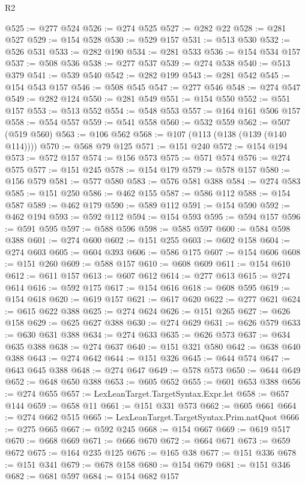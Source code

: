 \begin{lexlean}{R2}
\begin{coremodule}
@525 := @277 @524
@526 := @274 @525
@527 := @282 @22
@528 := @281 @527
@529 := @154 @528
@530 := @529 @157
@531 := @513 @530
@532 := @526 @531
@533 := @282 @190
@534 := @281 @533
@536 := @154 @534 @157
@537 := @508 @536
@538 := @277 @537
@539 := @274 @538
@540 := @513 @379
@541 := @539 @540
@542 := @282 @199
@543 := @281 @542
@545 := @154 @543 @157
@546 := @508 @545
@547 := @277 @546
@548 := @274 @547
@549 := @282 @124
@550 := @281 @549
@551 := @154 @550
@552 := @551 @157
@553 := @513 @552
@554 := @548 @553
@557 := @164 @161 @506 @157
@558 := @554 @557
@559 := @541 @558
@560 := @532 @559
@562 := @507 (@519 @560)
@563 := @106 @562
@568 := @107 (@113 (@138 (@139 (@140 @114))))
@570 := @568 @79 @125
@571 := @151 @240
@572 := @154 @194
@573 := @572 @157
@574 := @156 @573
@575 := @571 @574
@576 := @274 @575
@577 := @151 @245
@578 := @154 @179
@579 := @578 @157
@580 := @156 @579
@581 := @577 @580
@583 := @576 @581 @388
@584 := @274 @583
@585 := @151 @250
@586 := @462 @155
@587 := @586 @112
@588 := @154 @587
@589 := @462 @179
@590 := @589 @112
@591 := @154 @590
@592 := @462 @194
@593 := @592 @112
@594 := @154 @593
@595 := @594 @157
@596 := @591 @595
@597 := @588 @596
@598 := @585 @597
@600 := @584 @598 @388
@601 := @274 @600
@602 := @151 @255
@603 := @602 @158
@604 := @274 @603
@605 := @604 @393
@606 := @586 @175
@607 := @154 @606
@608 := @151 @260
@609 := @588 @157
@610 := @608 @609
@611 := @154 @610
@612 := @611 @157
@613 := @607 @612
@614 := @277 @613
@615 := @274 @614
@616 := @592 @175
@617 := @154 @616
@618 := @608 @595
@619 := @154 @618
@620 := @619 @157
@621 := @617 @620
@622 := @277 @621
@624 := @615 @622 @388
@625 := @274 @624
@626 := @151 @265
@627 := @626 @158
@629 := @625 @627 @388
@630 := @274 @629
@631 := @626 @579
@633 := @630 @631 @388
@634 := @274 @633
@635 := @626 @573
@637 := @634 @635 @388
@638 := @274 @637
@640 := @151 @321 @580
@642 := @638 @640 @388
@643 := @274 @642
@644 := @151 @326
@645 := @644 @574
@647 := @643 @645 @388
@648 := @274 @647
@649 := @578 @573
@650 := @644 @649
@652 := @648 @650 @388
@653 := @605 @652
@655 := @601 @653 @388
@656 := @274 @655
@657 := LexLeanTarget.TargetSyntax.Expr.let
@658 := @657 @144
@659 := @658 @11
@661 := @151 @331 @573
@662 := @605 @661
@664 := @274 @662 @515
@665 := LexLeanTarget.TargetSyntax.Prim.natQuot
@666 := @275 @665
@667 := @592 @245
@668 := @154 @667
@669 := @619 @517
@670 := @668 @669
@671 := @666 @670
@672 := @664 @671
@673 := @659 @672
@675 := @164 @235 @125
@676 := @165 @38
@677 := @151 @336
@678 := @151 @341
@679 := @678 @158
@680 := @154 @679
@681 := @151 @346
@682 := @681 @597
@684 := @154 @682 @157

\end{coremodule}
\end{lexlean}
